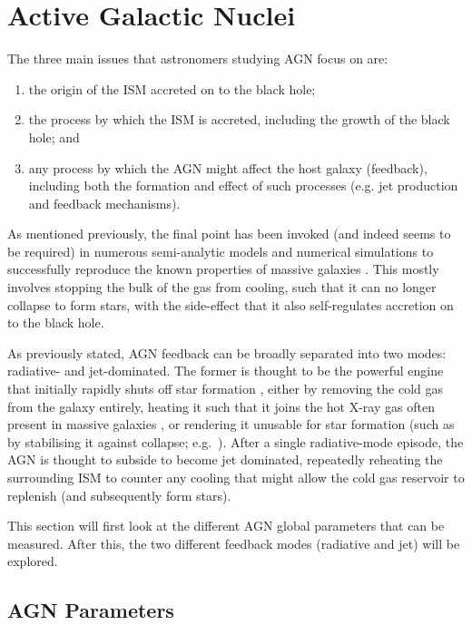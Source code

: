 \section{Active Galactic Nuclei}
	\label{sec:AGN}
	The three main issues that astronomers studying AGN focus on are:
	\begin{enumerate}
		\item the origin of the ISM accreted on to the black hole;
		\item the process by which the ISM is accreted, including the growth of the black hole; and
		\item any process by which the AGN might affect the host galaxy (feedback), including both the formation and effect of such processes (e.g. jet production and feedback mechanisms).
	\end{enumerate}
	As mentioned previously, the final point has been invoked (and indeed seems to be required) in numerous semi-analytic models and numerical simulations to successfully reproduce the known properties of massive galaxies \citep[e.g.][etc.]{DiMatteo2005, Bower2006, Springel2005}. This mostly involves stopping the bulk of the gas from cooling, such that it can no longer collapse to form stars, with the side-effect that it also self-regulates accretion on to the black hole.

	As previously stated, AGN feedback can be broadly separated into two modes: radiative- and jet-dominated. The former is thought to be the powerful engine that initially rapidly shuts off star formation \citep[e.g.][]{Thomas2005, Thomas2010}, either by removing the cold gas from the galaxy entirely, heating it such that it joins the hot X-ray gas often present in massive galaxies \citep[e.g.][]{OSullivan2001}, or rendering it unusable for star formation (such as by stabilising it against collapse; e.g.\ \citealt{Martig2009}). After a single radiative-mode episode, the AGN is thought to subside to become jet dominated, repeatedly reheating the surrounding ISM to counter any cooling that might allow the cold gas reservoir to replenish (and subsequently form stars). 

	This section will first look at the different AGN global parameters that can be measured. After this, the two different feedback modes (radiative and jet) will be explored.

	\subsection{AGN Parameters}
		\label{subsec:AGNparams}

